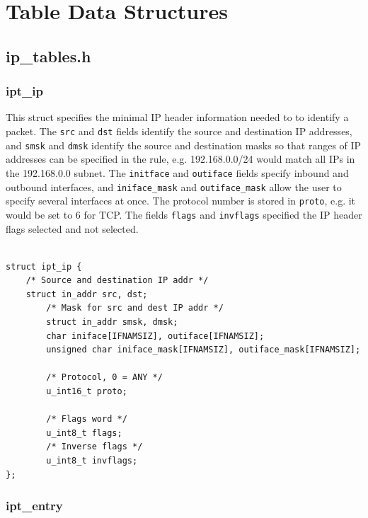 \documentclass[a4paper,10pt]{article}
\newcommand{\code}[1]{\texttt{{#1}}}
\begin{document}
\section{Table Data Structures}
  

\subsection{ip\_tables.h}


\subsubsection{ipt\_ip}\label{ipt_ip}

This struct specifies the minimal IP header information needed
to to identify a packet. The \code{src} and \code{dst} fields identify
the source and destination IP addresses, and \code{smsk} and
\code{dmsk} identify the source and destination masks so that ranges
of IP addresses can be specified in the rule, e.g. 192.168.0.0/24
would match all IPs in the 192.168.0.0 subnet. The \code{initface} and
\code{outiface} fields specify inbound and outbound interfaces, and
\code{iniface\_mask} and \code{outiface\_mask} allow the user to specify several
interfaces at once. The protocol number is stored in \code{proto},
e.g. it would be set to 6 for TCP. The fields \code{flags} and
\code{invflags} specified the IP header flags selected and not selected.

\begin{lstlisting}

struct ipt_ip {
	/* Source and destination IP addr */
	struct in_addr src, dst;
        /* Mask for src and dest IP addr */
        struct in_addr smsk, dmsk;
        char iniface[IFNAMSIZ], outiface[IFNAMSIZ];
        unsigned char iniface_mask[IFNAMSIZ], outiface_mask[IFNAMSIZ];

        /* Protocol, 0 = ANY */
        u_int16_t proto;

        /* Flags word */
        u_int8_t flags;
        /* Inverse flags */
        u_int8_t invflags;
};

\end{lstlisting}

\subsubsection{ipt\_entry}
\end{document}
